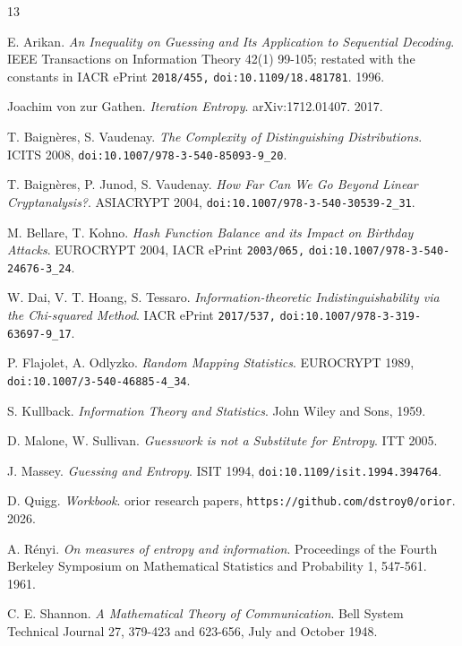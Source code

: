 \backmatter
{}
\begin{thebibliography}{13}

E. Arikan. \emph{An Inequality on Guessing and Its Application to Sequential Decoding}. IEEE Transactions on Information Theory 42(1) 99-105; restated with the constants in IACR ePrint \texttt{2018/\allowbreak{}455,} \texttt{doi:10.1109/\allowbreak{}18.481781}. 1996.

Joachim von zur Gathen. \emph{Iteration Entropy}. arXiv:1712.01407. 2017.

T. Baignères, S. Vaudenay. \emph{The Complexity of Distinguishing Distributions}. ICITS 2008, \texttt{doi:10.1007/\allowbreak{}978-3-540-85093-9\_\allowbreak{}20}.

T. Baignères, P. Junod, S. Vaudenay. \emph{How Far Can We Go Beyond Linear Cryptanalysis?}. ASIACRYPT 2004, \texttt{doi:10.1007/\allowbreak{}978-3-540-30539-2\_\allowbreak{}31}.

M. Bellare, T. Kohno. \emph{Hash Function Balance and its Impact on Birthday Attacks}. EUROCRYPT 2004, IACR ePrint \texttt{2003/\allowbreak{}065,} \texttt{doi:10.1007/\allowbreak{}978-3-540-24676-3\_\allowbreak{}24}.

W. Dai, V. T. Hoang, S. Tessaro. \emph{Information-theoretic Indistinguishability via the Chi-squared Method}. IACR ePrint \texttt{2017/\allowbreak{}537,} \texttt{doi:10.1007/\allowbreak{}978-3-319-63697-9\_\allowbreak{}17}.

P. Flajolet, A. Odlyzko. \emph{Random Mapping Statistics}. EUROCRYPT 1989, \texttt{doi:10.1007/\allowbreak{}3-540-46885-4\_\allowbreak{}34}.

S. Kullback. \emph{Information Theory and Statistics}. John Wiley and Sons, 1959.

D. Malone, W. Sullivan. \emph{Guesswork is not a Substitute for Entropy}. ITT 2005.

J. Massey. \emph{Guessing and Entropy}. ISIT 1994, \texttt{doi:10.1109/\allowbreak{}isit.1994.394764}.

D. Quigg. \emph{Workbook}. orior research papers, \texttt{https:/\allowbreak{}/\allowbreak{}github.com/\allowbreak{}dstroy0/\allowbreak{}orior}. 2026.

A. Rényi. \emph{On measures of entropy and information}. Proceedings of the Fourth Berkeley Symposium on Mathematical Statistics and Probability 1, 547-561. 1961.

C. E. Shannon. \emph{A Mathematical Theory of Communication}. Bell System Technical Journal 27, 379-423 and 623-656, July and October 1948.

\end{thebibliography}
